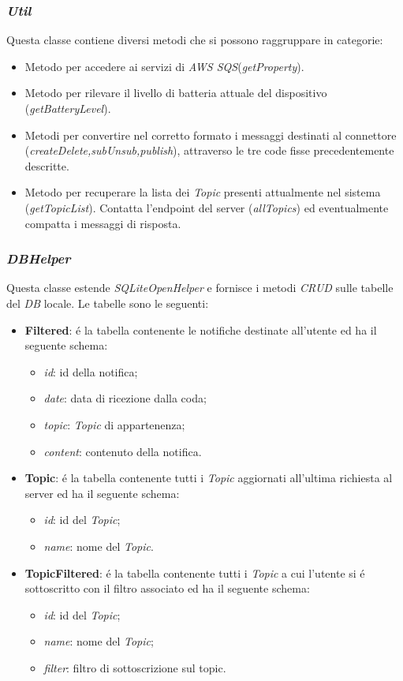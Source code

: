 \documentclass{article}
\begin{document}
\subsubsection{\textit{Util}}
Questa classe contiene diversi metodi che si possono raggruppare in categorie:
\begin{itemize}
\item{Metodo per accedere ai servizi di \textit{AWS SQS}(\textit{getProperty}).}
\item{Metodo per rilevare il livello di batteria attuale del dispositivo (\textit{getBatteryLevel}). }
\item{Metodi per convertire nel corretto formato i messaggi destinati al connettore (\textit{createDelete,subUnsub,publish}), attraverso le tre code fisse precedentemente descritte.}
\item{Metodo per recuperare la lista dei \textit{Topic} presenti attualmente nel sistema (\textit{getTopicList}). Contatta l'endpoint del server (\textit{allTopics}) ed eventualmente compatta i messaggi di risposta.}
\end{itemize}
\subsubsection{\textit{DBHelper}}
Questa classe estende \textit{SQLiteOpenHelper} e fornisce i metodi \textit{CRUD} sulle tabelle del \textit{DB} locale. Le tabelle sono le seguenti:
\begin{itemize}
\item \textbf{Filtered}: \'e la tabella contenente le notifiche destinate all'utente ed ha il seguente schema:
	\begin{itemize}
	\item	\textit{id}: id della notifica;
	\item 	\textit{date}: data di ricezione dalla coda;
	\item	\textit{topic}: \textit{Topic} di appartenenza;
	\item	\textit{content}: contenuto della notifica.
	\end{itemize}
\item \textbf{Topic}: \'e la tabella contenente tutti i \textit{Topic} aggiornati all'ultima richiesta al server ed ha il seguente schema:
	\begin{itemize}
	\item	\textit{id}: id del \textit{Topic};
	\item	\textit{name}: nome del \textit{Topic}.
	\end{itemize}
\item \textbf{TopicFiltered}: \'e la tabella contenente tutti i \textit{Topic} a cui l'utente si \'e sottoscritto con il filtro associato ed ha il seguente schema:
	\begin{itemize}
	\item	\textit{id}: id del \textit{Topic};
	\item	\textit{name}: nome del \textit{Topic};
	\item 	\textit{filter}: filtro di sottoscrizione sul topic.
	\end{itemize}
\end{itemize}
\end{document}
